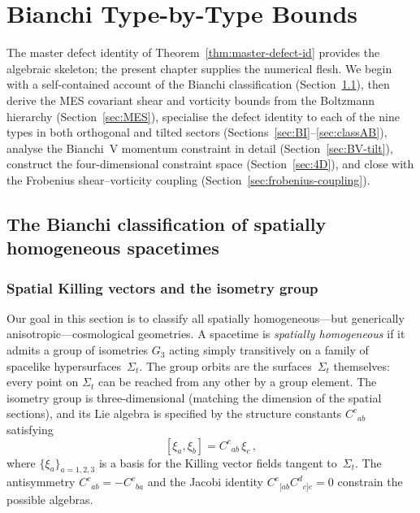 
\chapter{Bianchi Type-by-Type Bounds}\label{ch:bianchi-bounds}

The master defect identity of Theorem~\ref{thm:master-defect-id}
provides the algebraic skeleton; the present chapter supplies the
numerical flesh.  We begin with a self-contained account of the
Bianchi classification (Section~\ref{sec:bianchi-class}), then
derive the MES covariant shear and vorticity bounds from the Boltzmann
hierarchy (Section~\ref{sec:MES}), specialise the defect identity
to each of the nine types in both orthogonal and tilted sectors
(Sections~\ref{sec:BI}--\ref{sec:classAB}), analyse the Bianchi~V
momentum constraint in detail
(Section~\ref{sec:BV-tilt}), construct the four-dimensional
constraint space (Section~\ref{sec:4D}), and close with the
Frobenius shear--vorticity coupling
(Section~\ref{sec:frobenius-coupling}).


\section{The Bianchi classification of spatially homogeneous
  spacetimes}\label{sec:bianchi-class}

\subsection{Spatial Killing vectors and the isometry group}
\label{sec:killing}

Our goal in this section is to classify all spatially
homogeneous---but generically anisotropic---cosmological
geometries.  A spacetime is \emph{spatially homogeneous} if it
admits a group of isometries $G_3$ acting simply transitively
on a family of spacelike hypersurfaces~$\Sigma_t$.  The group
orbits are the surfaces~$\Sigma_t$ themselves: every point on
$\Sigma_t$ can be reached from any other by a group element.  The
isometry group is three-dimensional (matching the dimension of
the spatial sections), and its Lie algebra is specified by the
structure constants $C^c{}_{ab}$ satisfying
\begin{equation}\label{eq:lie-bracket}
[\xi_a, \xi_b] = C^c{}_{ab}\,\xi_c\,,
\end{equation}
where $\{\xi_a\}_{a=1,2,3}$ is a basis for the Killing vector
fields tangent to~$\Sigma_t$.  The antisymmetry
$C^c{}_{ab} = -C^c{}_{ba}$ and the Jacobi identity
$C^e{}_{[ab}C^d{}_{c]e} = 0$ constrain the possible algebras.


